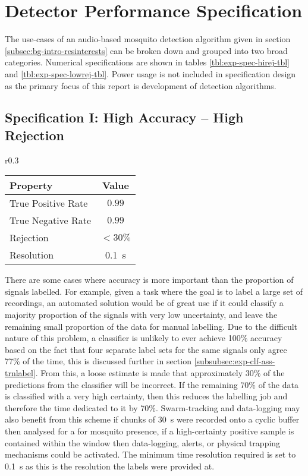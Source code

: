 \section{Detector Performance Specification}
\label{sec:exp-spec}
    The use-cases of an audio-based mosquito detection algorithm given in section \ref{subsec:bg-intro-resinterests} can be broken down and grouped into two broad categories. Numerical specifications are shown in tables \ref{tbl:exp-spec-hirej-tbl} and \ref{tbl:exp-spec-lowrej-tbl}. Power usage is not included in specification design as the primary focus of this report is development of detection algorithms. 
    \subsection{Specification I: High Accuracy -- High Rejection}
    \label{subsec:exp-spec-hirej}
        \begin{wraptable}{r}{0.3\textwidth}
            \scriptsize
            \singlespacing
            \centering
                \begin{tabular}{ |l||c| } 
                    \hline
                    Property & Value \\ 
                    \hline
                    \hline
                    True Positive Rate & $0.99$ \\
                    True Negative Rate & $0.99$ \\
                    Rejection & $<30\%$\\
                    Resolution & \SI{0.1}{\second}\\
                    \hline
                \end{tabular}
            \caption{High accuracy - high rejection specifications.}
            \label{tbl:exp-spec-hirej-tbl}
        \end{wraptable}
        There are some cases where accuracy is more important than the proportion of signals labelled. For example, given a task where the goal is to label a large set of recordings, an automated solution would be of great use if it could classify a majority proportion of the signals with very low uncertainty, and leave the remaining small proportion of the data for manual labelling. Due to the difficult nature of this problem, a classifier is unlikely to ever achieve 100\% accuracy based on the fact that four separate label sets for the same signals only agree 77\% of the time, this is discussed further in section \ref{subsubsec:exp-clf-ass-trnlabel}. From this, a loose estimate is made that approximately 30\% of the predictions from the classifier will be incorrect. If the remaining 70\% of the data is classified with a very high certainty, then this reduces the labelling job and therefore the time dedicated to it by 70\%. Swarm-tracking and data-logging may also benefit from this scheme if chunks of \SI{30}{\second} were recorded onto a cyclic buffer then analysed for a for mosquito presence, if a high-certainty positive sample is contained within the window then data-logging, alerts, or physical trapping mechanisms could be activated. The minimum time resolution required is set to \SI{0.1}{\second} as this is the resolution the labels were provided at.  
        
